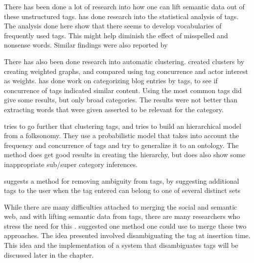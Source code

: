 There has been done a lot of research into how one can lift semantic data out of these unstructured tags.
\citet{Golder2005} has done research into the statistical analysis of tags.
The analysis done here show that there seems to develop vocabularies of frequently used tags.
This might help diminish the effect of misspelled and nonsense words. Similar findings were also reported by \citep{Shirky2007}

There has also been done research into automatic clustering.
\citet{Mika2005} created clusters by creating weighted graphs, and compared using tag concurrence and actor interest as weights.
\citet{Brooks2006} has done work on categorizing blog entries by tags, to see if concurrence of tags indicated similar content.
Using the most common tags did give some results, but only broad categories. The results were not better than extracting words that were given asserted to be relevant for the category.

\citep{Tang2009} tries to go further that clustering tags, and tries to build an hierarchical model from a folksonomy.
They use a probabilistic model that takes into account the frequency and concurrence of tags and try to generalize it to an ontology.
The method does get good results in creating the hierarchy, but does also show some inappropriate sub/super category inferences.

\citet{Weinberger2008} suggests a method for removing ambiguity from tags,
 by suggesting additional tags to the user when the tag entered can belong to one of several distinct sets

While there are many difficulties attached to merging the social and semantic web,
and with lifting semantic data from tags, there are many researchers who stress the need for this \citep{Passant2007,Mika2005, Gruber2007}.
\citet{Veres2011} suggested one method one could use to merge these two approaches.
The idea presented involved disambiguating the tag at insertion time.
This idea and the implementation of a system that disambiguates tags will be discussed later in the chapter.

